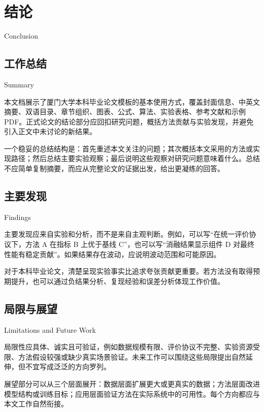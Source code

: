\chapter{结论}{Conclusion}

\section{工作总结}{Summary}

本文档展示了厦门大学本科毕业论文模板的基本使用方式，覆盖封面信息、中英文摘要、双语目录、章节组织、图表、公式、算法、实验表格、参考文献和示例 PDF。正式论文的结论部分应回扣研究问题，概括方法贡献与实验发现，并避免引入正文中未讨论的新结果。

一个稳妥的总结结构是：首先重述本文关注的问题；其次概括本文采用的方法或实现路径；然后总结主要实验观察；最后说明这些观察对研究问题意味着什么。总结不应简单复制摘要，而应从完整论文的证据出发，给出更凝练的回答。

\section{主要发现}{Findings}

主要发现应来自实验和分析，而不是来自主观判断。例如，可以写“在统一评价协议下，方法 A 在指标 B 上优于基线 C”，也可以写“消融结果显示组件 D 对最终性能有稳定贡献”。如果结果存在波动，应说明波动范围和可能原因。

对于本科毕业论文，清楚呈现实验事实比追求夸张贡献更重要。若方法没有取得预期提升，也可以通过负结果分析、复现经验和误差分析体现工作价值。

\section{局限与展望}{Limitations and Future Work}

局限性应具体、诚实且可验证，例如数据规模有限、评价协议不完整、实验资源受限、方法假设较强或缺少真实场景验证。未来工作可以围绕这些局限提出自然延伸，但不宜写成泛泛的方向罗列。

展望部分可以从三个层面展开：数据层面扩展更大或更真实的数据；方法层面改进模型结构或训练目标；应用层面验证方法在实际系统中的可用性。每个方向都应与本文工作自然衔接。
